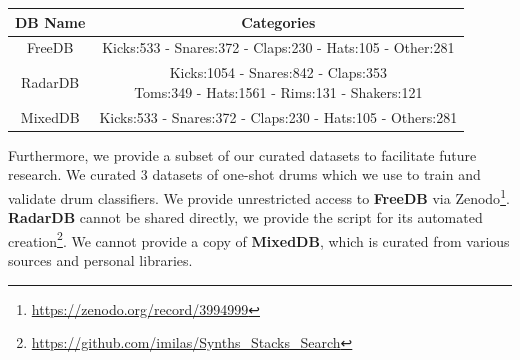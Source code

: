 \documentclass[runningheads,a4paper]{llncs}
\begin{document}
\begin{table}[b]
\centering
\begin{tabular}{ |c|c| } 
\hline
DB Name & Categories                                                        \\ \hline
FreeDB  & Kicks:533 - Snares:372 - Claps:230 - Hats:105 - Other:281            \\ \hline
RadarDB & \makecell{Kicks:1054 - Snares:842 - Claps:353 \\ Toms:349 - Hats:1561 - Rims:131 - Shakers:121} \\ \hline
MixedDB & Kicks:533 - Snares:372 - Claps:230 - Hats:105 - Others:281                     \\ \hline
\end{tabular}
    \label{table:datasets_overview}
\end{table}

Furthermore, we provide a subset of our curated datasets to facilitate future research. We curated 3 datasets of one-shot drums which we use to train and validate drum classifiers. We provide unrestricted access to \textbf{FreeDB} via Zenodo\footnote{\url{https://zenodo.org/record/3994999}}.
\textbf{RadarDB} cannot be shared directly, we provide the script for its automated creation\footnote{\url{https://github.com/imilas/Synths_Stacks_Search}}. We cannot provide a copy of \textbf{MixedDB}, which is curated from various sources and personal libraries. 
\end{document}
